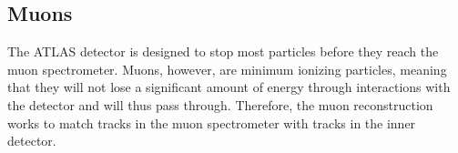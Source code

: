 \subsection{Muons}

The ATLAS detector is designed to stop most particles before they reach the muon spectrometer. Muons, however, are minimum ionizing particles, meaning that they will not lose a significant amount of energy through interactions with the detector and will thus pass through. Therefore, the muon reconstruction works to match tracks in the muon spectrometer with tracks in the inner detector. 







